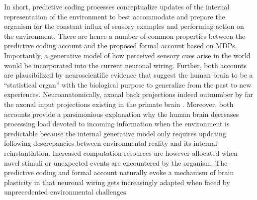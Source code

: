 \documentclass[10pt,letterpaper]{article}
\begin{document}
In short, predictive coding processes
conceptualize updates of the internal representation of the environment
to best accommodate and prepare the organism
for the constant influx of sensory examples and
performing action on the environment.
There are hence a number of common properties
between the predictive coding account
and the proposed formal account based on MDPs.
Importantly,
a generative model of how perceived sensory cues arise in the
world would be incorporated into
the current neuronal wiring.
Further,
both accounts are plausibilized by neuroscientific evidence that suggest
the human brain to be a ``statistical organ'' with the biological purpose to
generalize from the past to new experiences.
Neuroanatomically, axonal
back projections indeed outnumber by far the axonal input projections
existing in the primate brain \citep{salin1995corticocortical}.
Moreover,
both accounts provide a parsimonious explanation why the
human brain decreases processing load devoted to incoming information
when the environment is predictable because the internal generative
model only requires updating following descrepancies between
environmental reality and its internal reinstantiation.
Increased computation resources are however allocated
when novel stimuli or
unexpected events are encountered by the organism.
The predictive coding and formal account
naturally evoke a mechanism of brain plasticity in that
neuronal wiring gets increasingly adapted
when faced by unprecedented environmental challenges.
\end{document}

